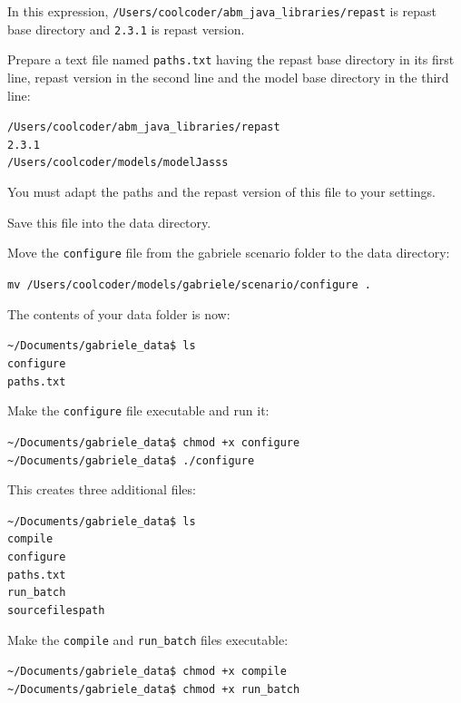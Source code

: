\documentclass{book}
\begin{document}
In this expression, \verb+/Users/coolcoder/abm_java_libraries/repast+ is repast base directory and \verb+2.3.1+ is repast version.

Prepare a text file named \verb+paths.txt+ having the repast base directory in its first line, repast version in the second line and the model base directory in the third line:

\color{magenta}
\vskip2mm \noindent
\verb+/Users/coolcoder/abm_java_libraries/repast+ \\
\verb+2.3.1+ \\
\verb+/Users/coolcoder/models/modelJasss+
\vskip2mm

\color{black}
You must adapt the paths and the repast version of this file to your settings.

Save this file into the data directory.

Move the \verb+configure+ file from the gabriele scenario folder to the data directory:

\verb+mv /Users/coolcoder/models/gabriele/scenario/configure . +


The contents of your data folder is now:

\vskip2mm
\noindent\verb+~/Documents/gabriele_data$ +\color{red}\verb+ls+ \color{blue}\\
\verb+configure+ \\
\verb+paths.txt+
\color{black}

\vskip2mm
Make the \verb+configure+ file executable and run it:

\vskip2mm
\noindent\verb+~/Documents/gabriele_data$ +\color{red}\verb|chmod +x configure| \color{black}\\
\verb+~/Documents/gabriele_data$ +\color{red}\verb|./configure| \color{black}

\vskip2mm
This creates three additional files:

\vskip2mm
\noindent\verb+~/Documents/gabriele_data$ +\color{red}\verb+ls+ \color{blue}\\
\verb+compile+\\ \color{green}
\verb+configure+\\ \color{blue}
\verb+paths.txt+ \\
\verb+run_batch+ \\
\verb+sourcefilespath+
\color{black}

\vskip2mm
Make the \verb+compile+ and \verb+run_batch+ files executable:

\vskip2mm
\noindent\verb+~/Documents/gabriele_data$ +\color{red}\verb|chmod +x compile| \color{black}\\
\verb+~/Documents/gabriele_data$ +\color{red}\verb|chmod +x run_batch| \color{black}
\vskip2mm
\end{document}
